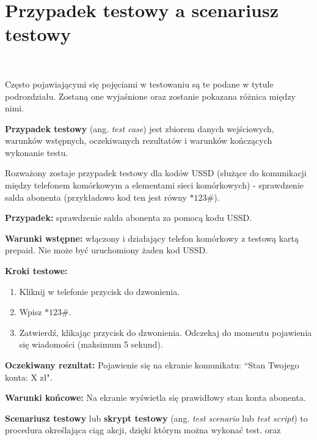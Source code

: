 \section{Przypadek testowy a scenariusz testowy} \ 

Często pojawiającymi się pojęciami w testowaniu są te podane w tytule podrozdziału. Zostaną one wyjaśnione oraz zostanie pokazana różnica między nimi.

\begin{df}
\textbf{Przypadek testowy} (ang. \textit{test case}) jest zbiorem danych wejściowych, warunków wstępnych, oczekiwanych rezultatów i warunków kończących wykonanie testu. \cite{przypadek}
\end{df}

\begin{prz}
Rozważony zostaje przypadek testowy dla kodów USSD (służące do komunikacji między telefonem komórkowym a elementami sieci komórkowych) - sprawdzenie salda abonenta (przykładowo kod ten jest równy $*123\#$). 

\noindent \textbf{Przypadek:} sprawdzenie salda abonenta za pomocą kodu USSD.

\noindent \textbf{Warunki wstępne:} włączony i działający telefon komórkowy z testową kartą prepaid. Nie może być uruchomiony żaden kod USSD.

\noindent \textbf{Kroki testowe:} 
\begin{enumerate}
    \item Kliknij w telefonie przycisk do dzwonienia.
    \item Wpisz $*123\#$.
    \item Zatwierdź, klikając przycisk do dzwonienia. Odczekaj do momentu pojawienia się wiadomości (maksimum 5 sekund).
\end{enumerate}

\noindent \textbf{Oczekiwany rezultat:} Pojawienie się na ekranie komunikatu: ``Stan Twojego konta: X zł".

\noindent \textbf{Warunki końcowe:} Na ekranie wyświetla się prawidłowy stan konta abonenta.

\end{prz}




\begin{df}
\textbf{Scenariusz testowy} lub \textbf{skrypt testowy} (ang. \textit{test scenario} lub \textit{test script}) to procedura określająca ciąg akcji, dzięki którym można wykonać test. \cite{roman} oraz \cite{ieee}
\end{df}

